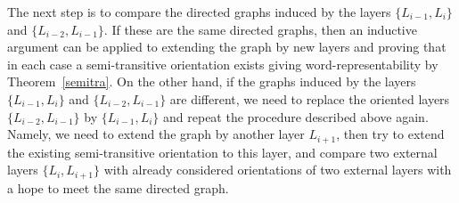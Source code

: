 \documentclass[12pt]{article}
\numberwithin{equation}{section}
\begin{document}
The next step is to compare the directed graphs induced by the layers $\{L_{i-1},L_{i}\}$ and $\{L_{i-2},L_{i-1}\}$. If these are the same directed graphs, then an inductive argument can be applied to extending the graph by new layers and proving that in each case a semi-transitive orientation exists giving word-representability by Theorem~\ref{semitra}. On the other hand, if  the graphs induced by the layers $\{L_{i-1},L_{i}\}$ and $\{L_{i-2},L_{i-1}\}$ are different, we need to replace the oriented layers $\{L_{i-2},L_{i-1}\}$ by  $\{L_{i-1},L_{i}\}$ and repeat the procedure described above again. Namely, we need to extend the graph by another layer $L_{i+1}$, then try to extend the existing semi-transitive orientation to this layer, and compare two external layers $\{L_{i},L_{i+1}\}$ with already considered orientations of two external layers with a hope to meet the same directed graph.
\end{document}
